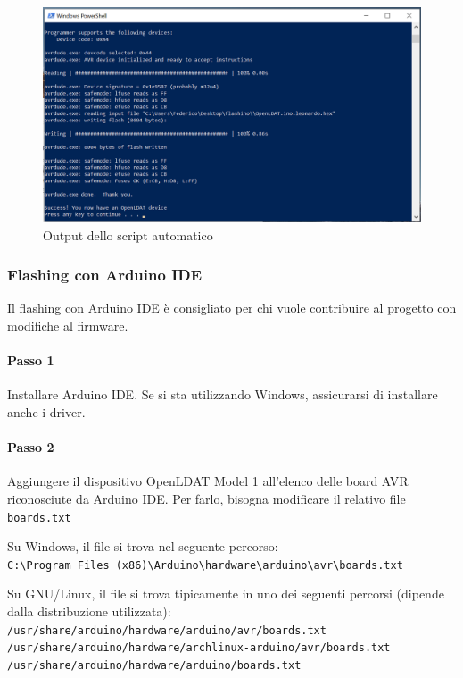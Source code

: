 \begin{figure}[H]
	\centering
	\includegraphics[width=\textwidth]{Dispositivo_files/flashing_08.png}
	\caption{Output dello script automatico}
	\label{fig:flashing_08}
\end{figure}

\subsubsection{Flashing con Arduino IDE}
Il flashing con Arduino IDE è consigliato per chi vuole contribuire al progetto con modifiche al firmware.

\paragraph{Passo 1} Installare Arduino IDE. Se si sta utilizzando Windows, assicurarsi di installare anche i driver.

\paragraph{Passo 2} Aggiungere il dispositivo OpenLDAT Model 1 all'elenco delle board AVR riconosciute da Arduino IDE. Per farlo, bisogna modificare il relativo file \texttt{boards.txt}

Su Windows, il file si trova nel seguente percorso:\\
	\texttt{C:\textbackslash Program Files (x86)\textbackslash Arduino\textbackslash hardware\textbackslash arduino\textbackslash avr\textbackslash boards.txt}

Su GNU/Linux, il file si trova tipicamente in uno dei seguenti percorsi (dipende dalla distribuzione utilizzata):\\
	\texttt{/usr/share/arduino/hardware/arduino/avr/boards.txt}\\
	\texttt{/usr/share/arduino/hardware/archlinux-arduino/avr/boards.txt}\\
	\texttt{/usr/share/arduino/hardware/arduino/boards.txt}

